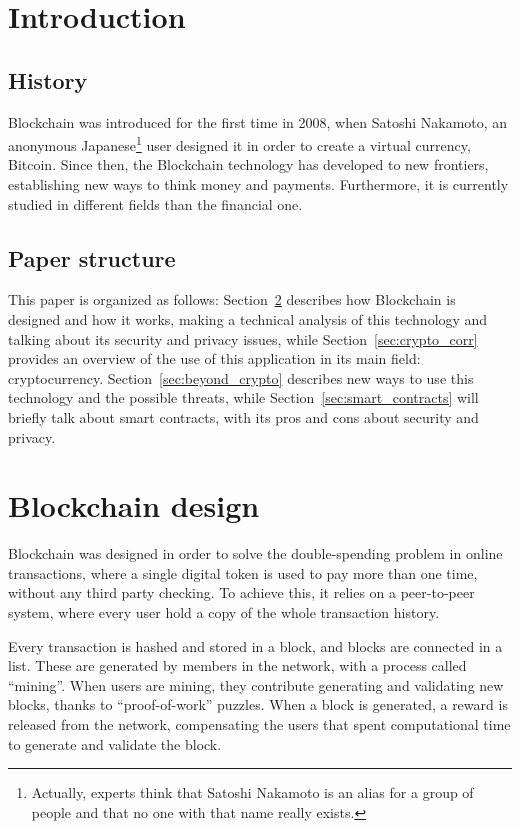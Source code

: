 \section{Introduction}

\subsection{History}
Blockchain was introduced for the first time in 2008, when Satoshi
Nakamoto, an anonymous Japanese\footnote{Actually, experts think that Satoshi
Nakamoto is an alias for a group of people and that no one with that name
really exists.} user designed it in order to create a virtual currency,
Bitcoin. Since then, the Blockchain technology has developed to new frontiers,
establishing new ways to think money and payments. Furthermore, it is currently
studied in different fields than the financial one.

\subsection{Paper structure}

This paper is organized as follows: Section~\ref{sec:block_design} describes
how Blockchain is designed and how it works, making a technical analysis of this
technology and talking about its security and privacy issues, while
Section~\ref{sec:crypto_corr} provides an overview of the
use of this application in its main field: cryptocurrency.
Section~\ref{sec:beyond_crypto} describes new ways to use this technology and
the possible threats, while Section~\ref{sec:smart_contracts} will briefly talk
about smart contracts, with its pros and cons about security and privacy.

\section{Blockchain design}
\label{sec:block_design}
Blockchain was designed in order to solve the double-spending problem in
online transactions, where a single digital token is used to pay more than one
time, without any third party checking\cite{nakamoto08}. To achieve this, it
relies on a peer-to-peer system, where every user hold a copy of the whole
transaction history.

Every transaction is hashed and stored in a block, and blocks are connected in
a list. These are generated by members in the network, with a process called
``mining''. When users are mining, they contribute generating and validating
new blocks, thanks to ``proof-of-work'' puzzles. When a block is
generated, a reward is released from the network, compensating the users that
spent computational time to generate and validate the block.

